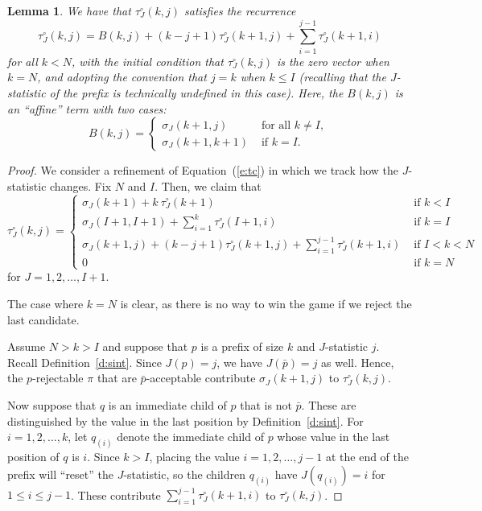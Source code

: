 \documentclass[11pt]{amsart}   %
\newtheorem{lemma}[theorem]{Lemma}
\theoremstyle{definition}
\theoremstyle{remark}
\numberwithin{equation}{section}
\theoremstyle{theorem}
\begin{document}
\begin{lemma}\label{l:basictau}
We have that $\tau^\circ_J(k,j)$ satisfies the recurrence
\[ \tau^\circ_J(k, j) =  B(k,j) + (k-j+1) \tau^\circ_J(k+1, j) + \sum_{i=1}^{j-1} \tau^\circ_J(k+1, i) \]
for all $k < N$, with the initial condition that $\tau^\circ_J(k,j)$ is the zero vector when $k = N$, and adopting the convention that $j = k$ when $k \leq I$ (recalling that the $J$-statistic of the prefix is technically undefined in this case).
Here, the $B(k,j)$ is an ``affine'' term with two cases:  
\[ B(k, j) = \begin{cases} \sigma_J(k+1, j) & \text{ for all $k \neq I$, } \\ \sigma_J(k+1, k+1) & \text{ if $k = I$. } \end{cases} \]
\end{lemma}
\begin{proof}
We consider a refinement of Equation~(\ref{e:tc}) in which we track how the $J$-statistic changes. 
Fix $N$ and $I$.  Then, we claim that
    \[ \tau^\circ_J(k, j) = \begin{cases}
            \sigma_J(k+1) + k \ \tau^\circ_J(k+1) & \text{ if $k < I$ } \\
            \sigma_J(I+1, I+1) + \sum_{i=1}^{k} \tau^\circ_J(I+1, i) & \text{ if $k = I$ } \\
            \sigma_J(k+1, j) + (k-j+1) \tau^\circ_J(k+1, j) + \sum_{i=1}^{j-1} \tau^\circ_J(k+1, i) & \text{ if $I < k < N$ } \\
            0 & \text{ if $k = N$ }
    \end{cases} \]
for $J = 1, 2, \ldots, I+1$.

The case where $k = N$ is clear, as there is no way to win the game if we
reject the last candidate.

Assume $N > k > I$ and suppose that $p$ is a prefix of size $k$ and
$J$-statistic $j$.  Recall Definition~\ref{d:sint}.  Since $J(p) = j$, we have
$J(\bar{p}) = j$ as well.  Hence, the $p$-rejectable $\pi$ that are
$\bar{p}$-acceptable contribute $\sigma_J(k+1, j)$ to $\tau^\circ_J(k, j)$.

Now suppose that $q$ is an immediate child of $p$ that is not $\bar{p}$.  These
are distinguished by the value in the last position by Definition~\ref{d:sint}.
For $i = 1, 2, \ldots, k$, let $q_{(i)}$ denote the immediate child of $p$
whose value in the last position of $q$ is $i$.  Since $k > I$, placing the
value $i = 1, 2, \ldots, j-1$ at the end of the prefix will ``reset'' the
$J$-statistic, so the children $q_{(i)}$ have $J(q_{(i)}) = i$ for $1 \leq i
\leq j-1$.  These contribute $\sum_{i=1}^{j-1} \tau^\circ_J(k+1, i)$ to
$\tau^\circ_J(k, j)$.


\end{proof}
\end{document}
